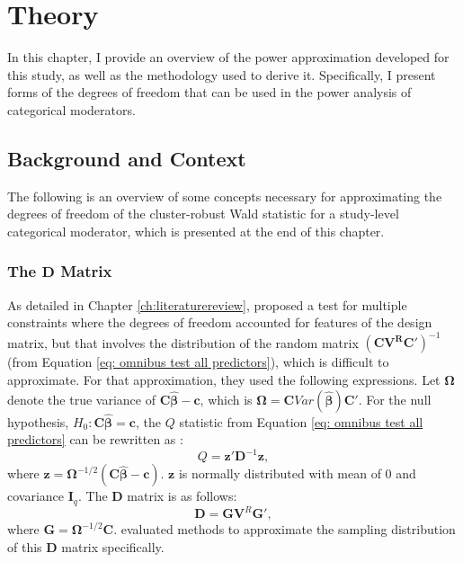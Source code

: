 \chapter{Theory} \label{ch: theory}

In this chapter, I provide an overview of the power approximation developed for this study, as well as the methodology used to derive it. Specifically, I present forms of the degrees of freedom that can be used in the power analysis of categorical moderators. 

\section{Background and Context}

The following is an overview of some concepts necessary for approximating the degrees of freedom of the cluster-robust Wald statistic for a study-level categorical moderator, which is presented at the end of this chapter.

\subsection{The \texorpdfstring{$\mathbf{D}$}{ } Matrix}

As detailed in Chapter \ref{ch:literaturereview}, \textcite{tipton2015b} proposed a test for multiple constraints where the degrees of freedom accounted for features of the design matrix, but that involves the distribution of the random matrix  $(\mathbf{C}\mathbf{V^R}\mathbf{C}')^{-1}$ (from Equation \ref{eq: omnibus test all predictors}), which is difficult to approximate. For that approximation, they used the following expressions. Let $\mathbf{\Omega}$ denote the true variance of $\mathbf{C}\bm{\hat{\beta}}-\mathbf{c}$, which is $\mathbf{\Omega} = \mathbf{C}Var(\bm{\hat{\beta}})\mathbf{C}'$. For the null hypothesis, $H_0: \mathbf{C}\mathbf{\hat{\beta}} = \mathbf{c}$, the $Q$ statistic from Equation \ref{eq: omnibus test all predictors} can be rewritten as \autocite{tipton2015b}:
\begin{equation} \label{eq: Q stat reformulation}
    Q = \mathbf{z}'\mathbf{D}^{-1}\mathbf{z},
\end{equation}
where $\mathbf{z} = \mathbf{\Omega}^{-1/2}(\mathbf{C}\bm{\hat{\beta}}-\mathbf{c})$. $\mathbf{z}$ is normally distributed with mean of $0$ and covariance $\mathbf{I}_q$. The $\mathbf{D}$ matrix is as follows:
\begin{equation} \label{eq: D matrix}
    \mathbf{D} = \bm{G}\mathbf{V}^R\bm{G}',
\end{equation}
where $\bm{G} = \bm{\Omega}^{-1/2} \bm{C}$. \textcite{tipton2015b} evaluated methods to approximate the sampling distribution of this $\mathbf{D}$ matrix specifically. 

